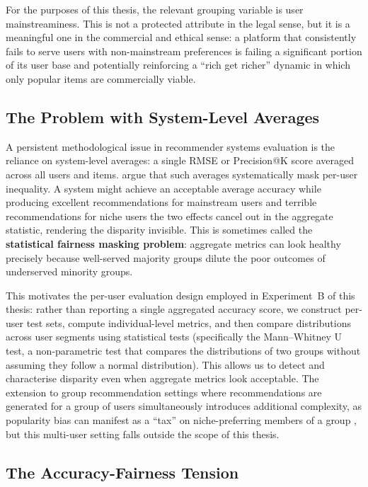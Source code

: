 \documentclass[11pt,a4paper]{report}
\begin{document}
For the purposes of this thesis, the relevant grouping variable is user mainstreaminess. This is not a protected attribute in the legal sense, but it is a meaningful one in the commercial and ethical sense: a platform that consistently fails to serve users with non-mainstream preferences is failing a significant portion of its user base and potentially reinforcing a ``rich get richer'' dynamic in which only popular items are commercially viable.

\subsection*{The Problem with System-Level Averages}

A persistent methodological issue in recommender systems evaluation is the reliance on system-level averages: a single RMSE or Precision@K score averaged across all users and items. \citet{leonhardt2018userfairness} argue that such averages systematically mask per-user inequality. A system might achieve an acceptable average accuracy while producing excellent recommendations for mainstream users and terrible recommendations for niche users the two effects cancel out in the aggregate statistic, rendering the disparity invisible. This is sometimes called the \textbf{statistical fairness masking problem}: aggregate metrics can look healthy precisely because well-served majority groups dilute the poor outcomes of underserved minority groups.

This motivates the per-user evaluation design employed in Experiment~B of this thesis: rather than reporting a single aggregated accuracy score, we construct per-user test sets, compute individual-level metrics, and then compare distributions across user segments using statistical tests (specifically the Mann--Whitney U test, a non-parametric test that compares the distributions of two groups without assuming they follow a normal distribution). This allows us to detect and characterise disparity even when aggregate metrics look acceptable. The extension to group recommendation settings where recommendations are generated for a group of users simultaneously introduces additional complexity, as popularity bias can manifest as a ``tax'' on niche-preferring members of a group \citep{yalcin2021group}, but this multi-user setting falls outside the scope of this thesis.

\subsection*{The Accuracy-Fairness Tension}
\end{document}
